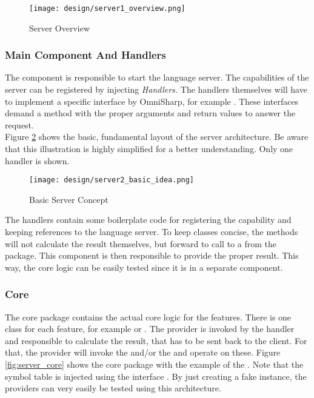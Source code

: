 \begin{figure}[H]
    \centering
    \texttt{[image: design/server1\_overview.png]}
    \caption{Server Overview}
    \label{fig:server_overview}
\end{figure}

\subsubsection{Main Component And Handlers}
The  component is responsible to start the language server.
The capabilities of the server can be registered by injecting \textit{Handlers.}
The handlers themselves will have to implement a specific interface by OmniSharp, for example .
These interfaces demand a  method with the proper arguments and return values to answer the request.\\

Figure \ref{fig:server_basic_idea} shows the basic, fundamental layout of the server architecture.
Be aware that this illustration is highly simplified for a better understanding.
Only one handler is shown.\\

\begin{figure}[ht]
    \centering
    \texttt{[image: design/server2\_basic\_idea.png]}
    \caption{Basic Server Concept}
    \label{fig:server_basic_idea}
\end{figure}

The handlers contain some boilerplate code for registering the capability and keeping references to the language server.
To keep classes concise, the  methods will not calculate the result themselves, but forward to call to a  from the  package.
This component is then responsible to provide the proper result.
This way, the core logic can be easily tested since it is in a separate component.\\

\subsubsection {Core}
The core package contains the actual core logic for the features.
There is one class for each feature, for example  or .
The provider is invoked by the handler and responsible to calculate the result, that has to be sent back to the client.
For that, the provider will invoke the  and/or the  and operate on these.
Figure \ref{fig:server_core} shows the core package with the example of the .
Note that the symbol table is injected using the interface .
By just creating a fake instance, the providers can very easily be tested using this architecture.

